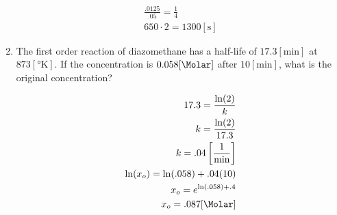 \documentclass[12pt]{article}
\begin{document}
\begin{enumerate}
    \begin{equation}
      \begin{split}
        \frac{.0125}{.05}=\frac{1}{4}\\
        650\cdot2=1300[\si{\second}]
      \end{split}
      \label{6}
    \end{equation}

  \item The first order reaction of diazomethane has a half-life of $17.3[\si{\minute}]$ at $873[\si{\degree\kelvin}]$. If the concentration is $0.058[\si{\Molar}]$ after $10[\si{\minute}]$, what is the original concentration?

    \begin{equation}
      \begin{split}
        17.3=\frac{\ln(2)}{k}\\
        k=\frac{\ln(2)}{17.3}\\
        k=.04\left[ \frac{1}{\si{\minute}} \right]\\
        \ln(x_o)=\ln(.058)+.04(10)\\
        x_o=e^{\ln(.058)+.4}\\
        x_o=.087[\si{\Molar}]
      \end{split}
      \label{7}
    \end{equation}

\end{enumerate}
\end{document}
